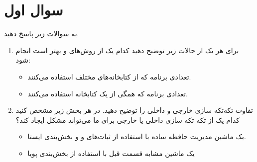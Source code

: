 \section{سوال اول}


به سوالات زیر پاسخ دهید.

\begin{enumerate}
	\item 
	برای هر یک از حالات زیر توضیح دهید کدام یک از روش‌های  و  بهتر است انجام شود:
	
	\begin{itemize}
		\item تعدادی برنامه که از کتابخانه‌های مختلف استفاده می‌کنند.
		\item تعدادی برنامه که همگی از یک کتابخانه استفاده می‌کنند.
	\end{itemize}
	
	
	
	\item 
	تفاوت تکه‌تکه سازی خارجی و داخلی را توضیح دهید. در هر بخش زیر مشخص کنید کدام یک از تکه تکه سازی داخلی یا خارجی برای ما می‌تواند مشکل ایجاد کند؟
	\begin{itemize}
		\item یک ماشین مدیریت حافظه ساده با استفاده از ثبات‌های  و  و بخش‌بندی ایستا.
		
		\item یک ماشین مشابه قسمت قبل با استفاده از بخش‌بندی پویا
	\end{itemize}
\end{enumerate}






